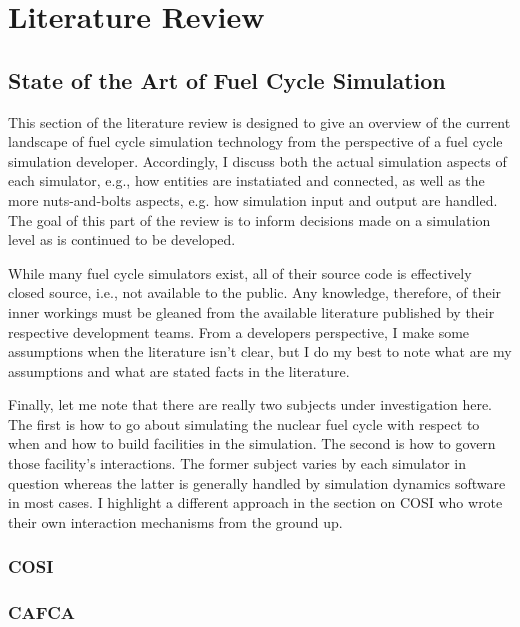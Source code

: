 \chapter{Literature Review}\label{ch:litreview}

\section{State of the Art of Fuel Cycle Simulation}\label{sec:simulators}

This section of the literature review is designed to give an overview of the
current landscape of fuel cycle simulation technology from the perspective of a
fuel cycle simulation developer. Accordingly, I discuss both the actual
simulation aspects of each simulator, e.g., how entities are instatiated and
connected, as well as the more nuts-and-bolts aspects, e.g. how simulation input
and output are handled. The goal of this part of the review is to inform
decisions made on a simulation level as \Cyclus is continued to be developed.

While many fuel cycle simulators exist, all of their source code is effectively
closed source, i.e., not available to the public. Any knowledge, therefore, of
their inner workings must be gleaned from the available literature published by
their respective development teams. From a developers perspective, I make some
assumptions when the literature isn't clear, but I do my best to note what are
my assumptions and what are stated facts in the literature.


Finally, let me note that there are really two subjects under investigation
here. The first is how to go about simulating the nuclear fuel cycle with
respect to when and how to build facilities in the simulation. The second is how
to govern those facility's interactions. The former subject varies by each
simulator in question whereas the latter is generally handled by simulation
dynamics software in most cases. I highlight a different approach in the section
on COSI who wrote their own interaction mechanisms from the ground up.

\subsection{COSI}\label{sec:cosi}
\subsection{CAFCA}\label{sec:cafca}
